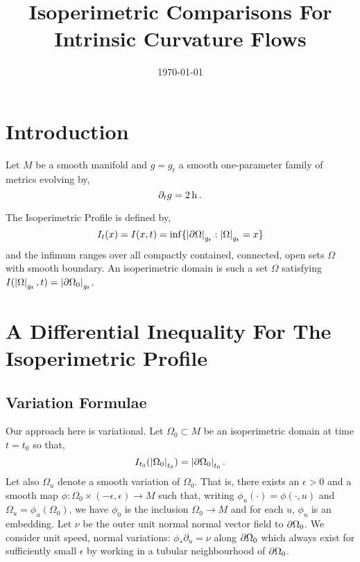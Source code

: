 \documentclass{amsart}
\begin{document}
\title[Isoperimetric Comparison]
 {Isoperimetric Comparisons For Intrinsic Curvature Flows}

\curraddr{}
\email{}
\date{\today}

\dedicatory{}
\subjclass[2010]{}
\keywords{}

\begin{abstract}
\end{abstract}

\maketitle

\section{Introduction}
\label{sec:intro}

Let \(M\) be a smooth manifold and \(g = g_t\) a smooth one-parameter family of metrics evolving by,
\begin{equation}
\label{eq:dtg}
\partial_t g = 2 \operatorname{h}.
\end{equation}

The Isoperimetric Profile is defined by,
\[
I_t (x) = I(x, t) = \inf\{\left|{\partial {\Omega}}\right|_{g_t} : \left|{\Omega}\right|_{g_t} = x\}
\]
and the infimum ranges over all compactly contained, connected, open sets \(\Omega\) with smooth boundary. An isoperimetric domain is such a set \(\Omega\) satisfying \(I(\left|{\Omega}\right|_{g_t}, t) = \left|{\partial {\Omega_0}}\right|_{g_t}\).

\section{A Differential Inequality For The Isoperimetric Profile}
\label{sec:iso_diff_ineq}

\subsection{Variation Formulae}
\label{subsec:iso_diff_ineq_variation}

Our approach here is variational. Let \(\Omega_0 \subset M\) be an isoperimetric domain at time \(t = t_0\) so that,
\[
I_{t_0} (\left|{\Omega_0}\right|_{t_0}) = \left|{\partial {\Omega_0}}\right|_{t_0}.
\]
Let also \(\Omega_u\) denote a smooth variation of \(\Omega_0\). That is, there exists an \(\epsilon > 0\) and a smooth map \(\phi: \Omega_0 \times (-\epsilon, \epsilon) \to M\) such that, writing \(\phi_u(\cdot) = \phi(\cdot, u)\) and \(\Omega_u = \phi_u(\Omega_0)\), we have \(\phi_0\) is the inclusion \(\Omega_0 \to M\) and for each \(u\), \(\phi_u\) is an embedding. Let \(\nu\) be the outer unit normal normal vector field to \(\partial {\Omega_0}\). We consider unit speed, normal variations: \(\phi_{\ast} \partial_u = \nu\) along \(\partial {\Omega_0}\) which always exist for sufficiently small \(\epsilon\) by working in a tubular neighbourhood of \(\partial {\Omega_0}\).
\end{document}
